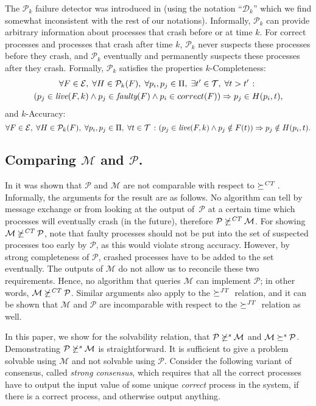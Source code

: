 \documentclass[11pt]{article}
\newcommand{\ident}[1]{\textit{#1}\rule{0cm}{1ex}}
\newcommand{\emn}[1]{{\em #1\/}}
\newcommand{\T}{\mathcal{T}}
\newcommand{\E}{\mathcal{E}}
\newcommand{\D}{\mathcal{D}}
\newcommand{\PFD}{\ensuremath{\mathcal{P}}}
\newcommand{\MFD}{\ensuremath{\mathcal{M}}}
\newcommand{\redCT}{\succeq^\ident{CT}}
\newcommand{\redJT}{\succeq^\ident{JT}}
\newcommand{\redSolv}{\succeq^{\ident{s}}}
\begin{document}
     
 

The $\PFD_k$ failure detector was introduced in \cite{bhatt:oteow}
     (using the notation ``$\D_k$'' which we find somewhat
     inconsistent with the rest of our notations).
Informally, $\PFD_k$ can provide arbitrary information about processes
     that crash before or at time $k$.
For correct processes and processes that crash after time $k$,
     $\PFD_k$ never suspects these processes before they crash, and
     $\PFD_k$ eventually and permanently suspects these processes
     after they crash.
Formally, $\PFD_k$ satisfies the properties $k$-Completeness: 
\begin{multline}
\forall F \in \E,\; 
\forall H \in \PFD_k(F),\;
\forall p_i,p_j \in \Pi,\;
\exists t' \in \T, \;
\forall t>t' \; 
 \colon \\
(p_j \in \ident{live}(F,k) \wedge p_j \in 
\ident{faulty}(F ) \wedge p_i \in correct
 (F) ) \Rightarrow p_j \in H(p_i, t), \nonumber
\end{multline}
and $k$-Accuracy:
$$\forall F \in \E,\; 
\forall H \in \PFD_k(F),\;
\forall p_i,p_j \in \Pi,\;
\forall t \in \T\ \colon
 (p_j\in \ident{live}(F,k)
\wedge p_j \notin F (t)) \Rightarrow p_j \notin H(p_i, t).$$


\subsection{Comparing $\MFD$ and $\PFD$.}

In \cite{guer:01:hfap} it was shown that $\PFD$ and $\MFD$ are not
     comparable with respect to $\redCT$.
Informally, the arguments for the result are as follows.
No algorithm can tell by message exchange or from looking at the
     output of~$\PFD$ at a certain time which processes will
     eventually crash (in the future), therefore $\PFD\not\redCT\MFD$.
For showing $\MFD\not\redCT\PFD$, note that faulty processes should
     not be put into the set of suspected processes too early by
     $\PFD$, as this would violate strong accuracy.
However, by strong completeness of $\PFD$, crashed processes have to
     be added to the set eventually.
The outputs of $\MFD$ do not allow us to reconcile these two
     requirements.
Hence, no algorithm that queries $\MFD$ can implement $\PFD$; in other
     words, $\MFD\not\redCT\PFD$.
Similar arguments also apply to the $\redJT$ relation, and it can be
     shown that $\MFD$ and $\PFD$ are incomparable with respect to the
     $\redJT$ relation as well.

In this paper, we show for the solvability relation, that
     $\PFD\not\redSolv\MFD$ and $\MFD\redSolv\PFD$.
Demonstrating $\PFD\not\redSolv\MFD$ is straightforward.
It is sufficient to give a problem solvable using $\MFD$ and not
     solvable using $\PFD$.
Consider the following variant of consensus, called \emn{strong
     consensus}, which requires that all the correct processes have to
     output the input value of some unique \emph{correct} process in
     the system, if there is a correct process, and otherwise output
     anything.
\end{document}

